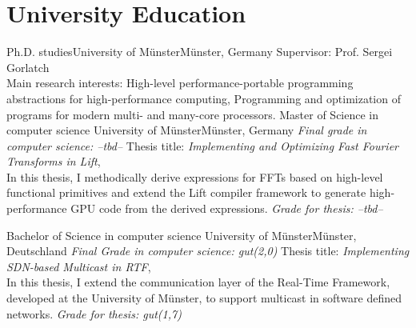 \documentclass[11pt,a4paper,sans]{moderncv}        %
\begin{document}
\nocite{*}
\makecvtitle

\section{University Education}
          {Ph.D. studies}{University of Münster}{Münster, Germany}{}{
          Supervisor: Prof. Sergei Gorlatch\\
          Main research interests: High-level performance-portable programming abstractions for high-performance computing,
          Programming and optimization of programs for modern multi- and many-core processors.}
					{Master of Science in computer science}
					{University of Münster}{Münster, Germany}
					{\textit{Final grade in computer science: --tbd--}}
					{Thesis title: \textit{Implementing and Optimizing Fast Fourier Transforms in Lift},\\
           In this thesis, I methodically derive expressions for FFTs based on high-level functional primitives and extend the Lift compiler framework to generate high-performance GPU code from the derived expressions. \textit{Grade for thesis: --tbd--}}

					{Bachelor of Science in computer science}
					{University of Münster}{Münster, Deutschland}
					{\textit{Final Grade in computer science: gut(2,0)}}
					{Thesis title: \textit{Implementing SDN-based Multicast in RTF},\\
          In this thesis, I extend the communication layer of the Real-Time Framework, developed at the University of Münster, to support multicast in software defined networks. \textit{Grade for thesis: gut(1,7)}
					}
\printbibheading[title={Publications}]
\printbibliography[heading=none]
%
%
\end{document}
